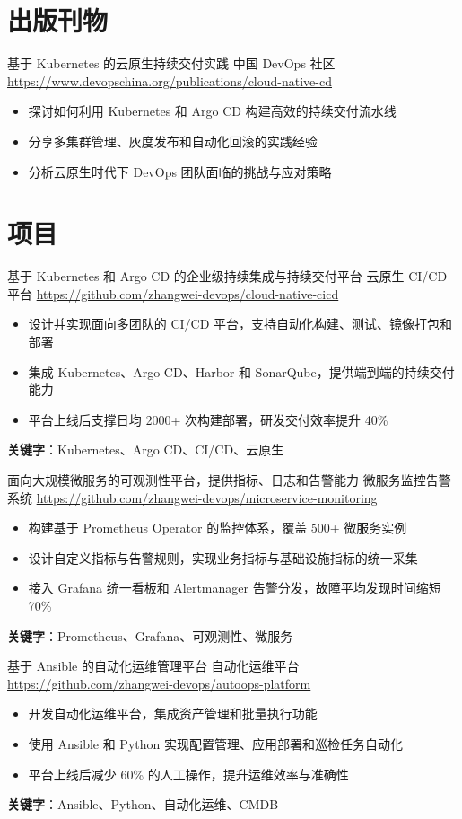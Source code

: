 \documentclass[a4paper, serif, 10pt]{moderncv}
\begin{document}
\section{出版刊物}

        {基于 Kubernetes 的云原生持续交付实践}
        {中国 DevOps 社区}
        {\url{https://www.devopschina.org/publications/cloud-native-cd}}
        {}
        {\begin{itemize}
\item 探讨如何利用 Kubernetes 和 Argo CD 构建高效的持续交付流水线
\item 分享多集群管理、灰度发布和自动化回滚的实践经验
\item 分析云原生时代下 DevOps 团队面临的挑战与应对策略
\end{itemize}}
\section{项目}

        {基于 Kubernetes 和 Argo CD 的企业级持续集成与持续交付平台}
        {云原生 CI/CD 平台}
        {\url{https://github.com/zhangwei-devops/cloud-native-cicd}}
        {}
        {\begin{itemize}
\item 设计并实现面向多团队的 CI/CD 平台，支持自动化构建、测试、镜像打包和部署
\item 集成 Kubernetes、Argo CD、Harbor 和 SonarQube，提供端到端的持续交付能力
\item 平台上线后支撑日均 2000+ 次构建部署，研发交付效率提升 40\%
\end{itemize}
\textbf{关键字}：Kubernetes、Argo CD、CI/CD、云原生}

        {面向大规模微服务的可观测性平台，提供指标、日志和告警能力}
        {微服务监控告警系统}
        {\url{https://github.com/zhangwei-devops/microservice-monitoring}}
        {}
        {\begin{itemize}
\item 构建基于 Prometheus Operator 的监控体系，覆盖 500+ 微服务实例
\item 设计自定义指标与告警规则，实现业务指标与基础设施指标的统一采集
\item 接入 Grafana 统一看板和 Alertmanager 告警分发，故障平均发现时间缩短 70\%
\end{itemize}
\textbf{关键字}：Prometheus、Grafana、可观测性、微服务}

        {基于 Ansible 的自动化运维管理平台}
        {自动化运维平台}
        {\url{https://github.com/zhangwei-devops/autoops-platform}}
        {}
        {\begin{itemize}
\item 开发自动化运维平台，集成资产管理和批量执行功能
\item 使用 Ansible 和 Python 实现配置管理、应用部署和巡检任务自动化
\item 平台上线后减少 60\% 的人工操作，提升运维效率与准确性
\end{itemize}
\textbf{关键字}：Ansible、Python、自动化运维、CMDB}
\end{document}

